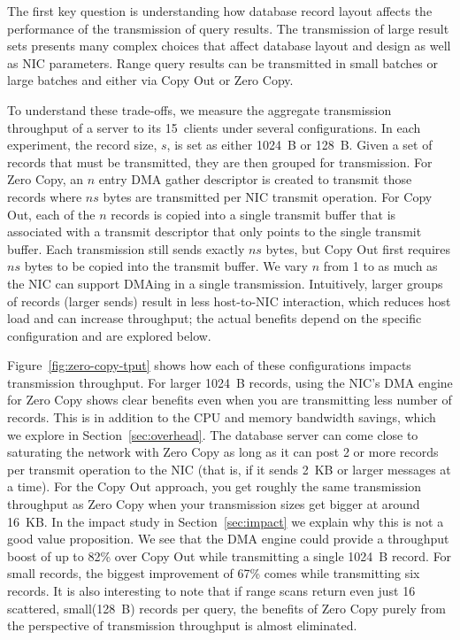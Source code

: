 The first key question is understanding how database record layout affects the
performance of the transmission of query results.  The transmission of large
result sets presents many complex choices that affect
database layout and design as well as NIC parameters.  Range query
results can be transmitted in small batches or large batches and either via
Copy Out or Zero Copy.

To understand these trade-offs, we measure the aggregate transmission
throughput of a server to its 15~clients under several
configurations.  In each experiment, the record size, $s$, is set as either 1024~B or
128~B. Given a set of records that must be transmitted, they are then grouped
for transmission. For Zero Copy, an $n$ entry DMA gather descriptor is created
to transmit those records where $ns$ bytes are transmitted per NIC transmit
operation. For Copy Out, each of the $n$ records is copied into a single
transmit buffer that is associated with a transmit descriptor that only points
to the single transmit buffer. Each transmission still sends exactly $ns$
bytes, but Copy Out first requires $ns$ bytes to be copied into the transmit buffer.
We vary $n$ from 1 to as much as the NIC can support DMAing in a single transmission.
Intuitively, larger groups of records (larger sends) result in less host-to-NIC
interaction, which reduces host load and can increase throughput; the actual benefits
depend on the specific configuration and are explored below.

Figure~\ref{fig:zero-copy-tput} shows how each of these configurations impacts
transmission throughput. For larger 1024~B records, using the NIC's DMA engine
for Zero Copy shows clear benefits even when you are transmitting less number of 
records. This is in addition to the CPU and memory bandwidth savings, which 
we explore in Section~\ref{sec:overhead}. The database server can come close to
saturating the network with Zero Copy as long as it can post 2 or more
records per transmit operation to the NIC (that is, if it sends 2~KB or larger
messages at a time). For the Copy Out approach, you get roughly the same transmission 
throughput as Zero Copy when your transmission sizes get bigger at around 16~KB. In 
the impact study in Section~\ref{sec:impact} we explain why this is not a good value 
proposition. We see that the DMA engine could provide a throughput boost
of up to 82\% over Copy Out while transmitting a single 1024~B record. For small 
records, the biggest improvement of 67\% comes while transmitting six records. It is also interesting 
to note that if range scans return even just 16 scattered, small(128~B) records per query, the
benefits of Zero Copy purely from the perspective of transmission throughput is almost eliminated.

